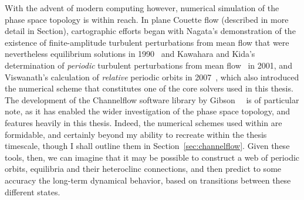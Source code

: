 With the advent of modern computing however, numerical simulation of the phase space topology is within reach. In plane Couette flow (described in more detail in Section), cartographic efforts began with Nagata's demonstration of the existence of finite-amplitude turbulent perturbations from mean flow that were nevertheless equilibrium solutions in 1990~\cite{Nagata1990} and Kawahara and Kida's determination of \emph{periodic} turbulent perturbations from mean flow~\cite{Kawahara2001} in 2001, and Viswanath's calculation of \emph{relative} periodic orbits in 2007~\cite{Viswanath2007}, which also introduced the numerical scheme that constitutes one of the core solvers used in this thesis. The development of the Channelflow software library by Gibson~\cite{Gibson2008}~\cite{Gibson2014} is of particular note, as it has enabled the wider investigation of the phase space topology, and features heavily in this thesis. Indeed,  the numerical schemes used within are formidable, and certainly beyond my ability to recreate within the thesis timescale, though I shall outline them in Section~\ref{sec:channelflow}. Given these tools, then, we can imagine that it may be possible to construct a web of periodic orbits, equilibria and their heteroclinc connections, and then predict to some accuracy the long-term dynamical behavior, based on transitions between these different states. 
